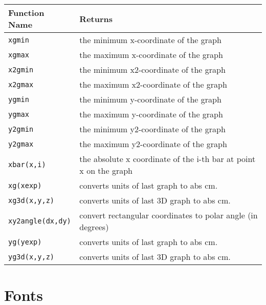 \begin{supertabular}{ll} \hline
Function Name     & Returns  \\ \hline
{\tt xgmin}  & the minimum x-coordinate of the graph \\
{\tt xgmax}  & the maximum x-coordinate of the graph \\
{\tt x2gmin}  & the minimum x2-coordinate of the graph \\
{\tt x2gmax}  & the maximum x2-coordinate of the graph \\
{\tt ygmin}  & the minimum y-coordinate of the graph \\
{\tt ygmax}  & the maximum y-coordinate of the graph \\
{\tt y2gmin}  & the minimum y2-coordinate of the graph \\
{\tt y2gmax}  & the maximum y2-coordinate of the graph \\
{\tt xbar(x,i)}         	& the absolute x coordinate of the i-th bar at point x on the graph \\
{\tt xg(xexp)}              & converts units of last graph to abs cm. \\
{\tt xg3d(x,y,z)}         & converts units of last 3D graph to abs cm. \\
{\tt xy2angle(dx,dy)} & convert rectangular coordinates to polar angle (in degrees)\\
{\tt yg(yexp)}              & converts units of last graph to abs cm. \\
{\tt yg3d(x,y,z)}         & converts units of last 3D graph to abs cm. \\

\end{supertabular}


\newpage


\section{Fonts}

 
\newpage

% 
% 
%
% 
% 
% 
% 
% 

